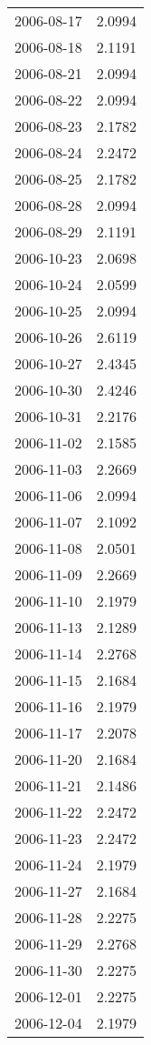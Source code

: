 \begin{tabular}{lr}
2006-08-17 &      2.0994 \\
2006-08-18 &      2.1191 \\
2006-08-21 &      2.0994 \\
2006-08-22 &      2.0994 \\
2006-08-23 &      2.1782 \\
2006-08-24 &      2.2472 \\
2006-08-25 &      2.1782 \\
2006-08-28 &      2.0994 \\
2006-08-29 &      2.1191 \\
2006-10-23 &      2.0698 \\
2006-10-24 &      2.0599 \\
2006-10-25 &      2.0994 \\
2006-10-26 &      2.6119 \\
2006-10-27 &      2.4345 \\
2006-10-30 &      2.4246 \\
2006-10-31 &      2.2176 \\
2006-11-02 &      2.1585 \\
2006-11-03 &      2.2669 \\
2006-11-06 &      2.0994 \\
2006-11-07 &      2.1092 \\
2006-11-08 &      2.0501 \\
2006-11-09 &      2.2669 \\
2006-11-10 &      2.1979 \\
2006-11-13 &      2.1289 \\
2006-11-14 &      2.2768 \\
2006-11-15 &      2.1684 \\
2006-11-16 &      2.1979 \\
2006-11-17 &      2.2078 \\
2006-11-20 &      2.1684 \\
2006-11-21 &      2.1486 \\
2006-11-22 &      2.2472 \\
2006-11-23 &      2.2472 \\
2006-11-24 &      2.1979 \\
2006-11-27 &      2.1684 \\
2006-11-28 &      2.2275 \\
2006-11-29 &      2.2768 \\
2006-11-30 &      2.2275 \\
2006-12-01 &      2.2275 \\
2006-12-04 &      2.1979 \\

\end{tabular}
